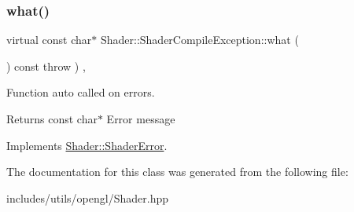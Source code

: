 \subsubsection{\texorpdfstring{what()}{what()}}
{\footnotesize\ttfamily virtual const char$\ast$ Shader\+::\+Shader\+Compile\+Exception\+::what (\begin{DoxyParamCaption}{ }\end{DoxyParamCaption}) const throw  ) \hspace{0.3cm}{\ttfamily [inline]}, {\ttfamily [virtual]}}



Function auto called on errors. 

\begin{DoxyReturn}{Returns}
const char$\ast$ Error message 
\end{DoxyReturn}


Implements \hyperlink{class_shader_1_1_shader_error_aae7a37e1a4590a9347142d236e62372a}{Shader\+::\+Shader\+Error}.



The documentation for this class was generated from the following file\+:\begin{DoxyCompactItemize}
\item 
includes/utils/opengl/Shader.\+hpp\end{DoxyCompactItemize}
